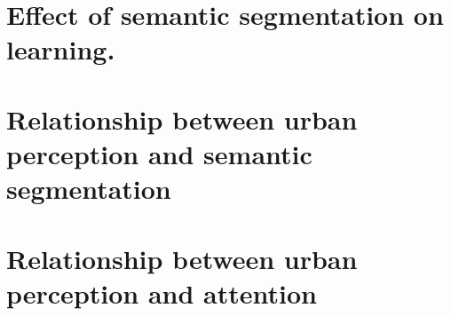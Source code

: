 \section{Effect of semantic segmentation on learning.}

\section{Relationship between urban perception and semantic segmentation}

\section{Relationship between urban perception and attention}